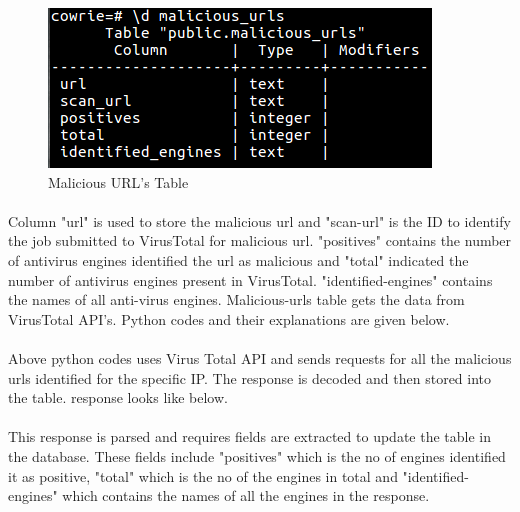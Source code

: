 \documentclass{article}
\begin{document}
\begin{figure}[H]
\centering
\caption{Malicious URL's Table}
\includegraphics[scale=0.7]{Malicious_Urls}
\end{figure}

\paragraph{}
Column "url" is used to store the malicious url and "scan-url" is the ID to identify the job submitted to VirusTotal for malicious url. "positives" contains the number of antivirus engines identified the url as malicious and   "total" indicated the number of antivirus engines present in VirusTotal. "identified-engines" contains the names of all anti-virus engines. Malicious-urls table gets the data from VirusTotal API's. Python codes and their explanations are given below.

 


 


 


 



\paragraph{}
Above python codes uses Virus Total API and sends requests for all the malicious urls identified for the specific IP. The response is decoded and then stored into the table. response looks like below.



\paragraph{}
This response is parsed and requires fields are extracted to update the table in the database. These fields include "positives" which is the no of engines identified it as positive, "total" which is the no of the engines in total  and "identified-engines" which contains the names of all the engines in the response.
\end{document}
